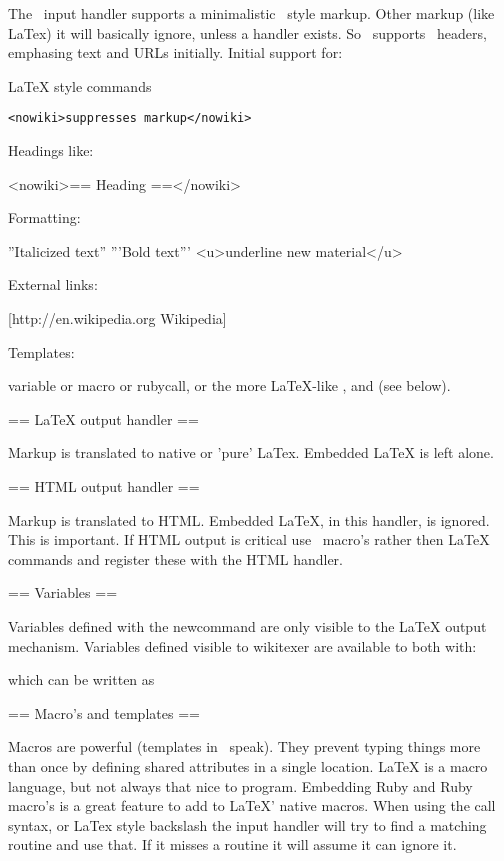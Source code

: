 The \mediawiki\ input handler supports a minimalistic \mediawiki\ style
markup. Other markup (like LaTex) it will basically ignore, unless a
handler exists. So \wikitexer\ supports \mediawiki\ headers, emphasing text
and URLs initially. Initial support for:

LaTeX style commands

\begin{verbatim}
<nowiki>suppresses markup</nowiki>
\end{verbatim}

Headings like:

<nowiki>== Heading ==</nowiki>

Formatting:

''Italicized text''
'''Bold text'''
<u>underline new material</u>

External links:

[http://en.wikipedia.org Wikipedia]

Templates:

{{variable}} or {{macro}} or {{rubycall}}, or the more LaTeX-like
\variable, \macro and \rubycall (see below).


== LaTeX output handler ==

Markup is translated to native or 'pure' LaTex. Embedded LaTeX is left alone.


== HTML output handler ==

Markup is translated to HTML. Embedded LaTeX, in this handler, is
ignored. This is important. If HTML output is critical use \wikitexer\
macro's rather then LaTeX commands and register these with the HTML
handler.

== Variables ==

Variables defined with the newcommand are only visible to the LaTeX
output mechanism. Variables defined visible to wikitexer are available
to both with:


which can be written as


== Macro's and templates ==

Macros are powerful (templates in \mediawiki\ speak). They prevent
typing things more than once by defining shared attributes in a single
location.  LaTeX is a macro language, but not always that nice to
program.  Embedding Ruby and Ruby macro's is a great feature to add to
LaTeX' native macros. When using the {{call}} syntax, or LaTex style
backslash \call the input handler will try to find a matching routine
and use that. If it misses a routine it will assume it can ignore it.

